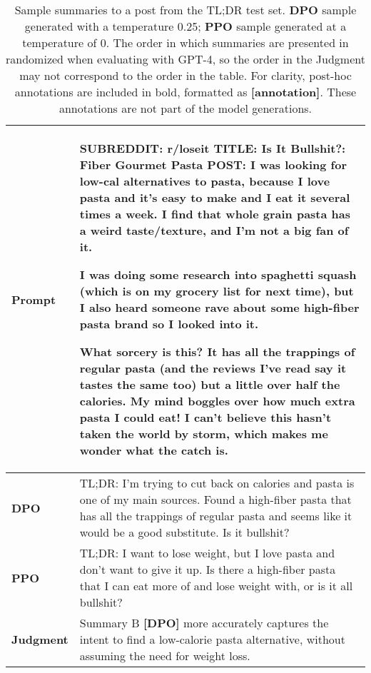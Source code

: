 \documentclass{article}
\begin{document}
\begin{table}
    \centering
    \begin{tabular}{lp{11.5cm}}
        \toprule
        \textbf{Prompt} & SUBREDDIT: r/loseit
        TITLE: Is It Bullshit?: Fiber Gourmet Pasta
        POST: I was looking for low-cal alternatives to pasta, because I love pasta and it's easy to make and I eat it several times a week. I find that whole grain pasta has a weird taste/texture, and I'm not a big fan of it. 
        
        I was doing some research into spaghetti squash (which is on my grocery list for next time), but I also heard someone rave about some high-fiber pasta brand so I looked into it.
        
        What sorcery is this? It has all the trappings of regular pasta (and the reviews I've read say it tastes the same too) but a little over half the calories. My mind boggles over how much extra pasta I could eat! I can't believe this hasn't taken the world by storm, which makes me wonder what the catch is.
         \\
        \midrule
        \textbf{DPO} & TL;DR: I'm trying to cut back on calories and pasta is one of my main sources. Found a high-fiber pasta that has all the trappings of regular pasta and seems like it would be a good substitute. Is it bullshit?\\
        \midrule
        \textbf{PPO} & TL;DR: I want to lose weight, but I love pasta and don't want to give it up. Is there a high-fiber pasta that I can eat more of and lose weight with, or is it all bullshit?\\
        \midrule
        \textbf{Judgment} & Summary B \textbf{[DPO]} more accurately captures the intent to find a low-calorie pasta alternative, without assuming the need for weight loss. \\
        \bottomrule
    \end{tabular}
    \vspace{4mm}
    \caption{Sample summaries to a post from the TL;DR test set. \textbf{DPO} sample generated with a temperature 0.25; \textbf{PPO} sample generated at a temperature of 0. The order in which summaries are presented in randomized when evaluating with GPT-4, so the order in the Judgment may not correspond to the order in the table. For clarity, post-hoc annotations are included in bold, formatted as \textbf{[annotation]}. These annotations are not part of the model generations.}
    \label{tab:summ-ex-3}
\end{table}
\end{document}
